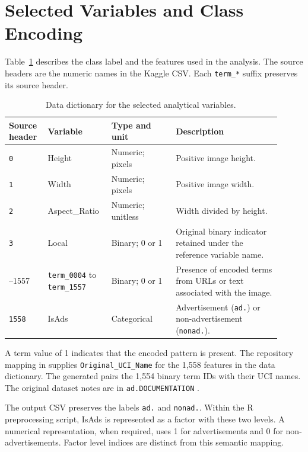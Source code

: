 \section{Selected Variables and Class Encoding}

Table~\ref{tab:selected-variables} describes the class label and the
features used in the analysis. The source headers are the numeric names in
the Kaggle CSV. Each \texttt{term\_*} suffix preserves its source header.

\begin{table}[htbp]
\centering
\small
\caption{Data dictionary for the selected analytical variables.}
\label{tab:selected-variables}
\begin{tabular}{@{}>{\raggedright\arraybackslash}p{0.13\linewidth}
                   >{\raggedright\arraybackslash}p{0.20\linewidth}
                   >{\raggedright\arraybackslash}p{0.22\linewidth}
                   >{\raggedright\arraybackslash}p{0.36\linewidth}@{}}
\toprule
Source header & Variable & Type and unit & Description\\
\midrule
\texttt{0} & Height & Numeric; pixels & Positive image height.\\
\texttt{1} & Width & Numeric; pixels & Positive image width.\\
\texttt{2} & Aspect\_Ratio & Numeric; unitless & Width divided by height.\\
\texttt{3} & Local & Binary; 0 or 1 & Original binary indicator retained under the reference variable name.\\
4--1557 & \texttt{term\_0004} to \texttt{term\_1557} & Binary; 0 or 1 & Presence of encoded terms from URLs or text associated with the image.\\
\texttt{1558} & IsAds & Categorical & Advertisement (\texttt{ad.}) or non-advertisement (\texttt{nonad.}).\\
\bottomrule
\end{tabular}
\end{table}

A term value of 1 indicates that the encoded pattern is present.
The repository mapping in  supplies
\texttt{Original\_UCI\_Name} for the 1,558 features in the data dictionary.
The generated  pairs the 1,554 binary term IDs with
their UCI names. The original dataset notes are in
\texttt{ad.DOCUMENTATION} \citep{kushmerick1999}.

The output CSV preserves the labels \texttt{ad.} and \texttt{nonad.}.
Within the R preprocessing script, IsAds is represented as a factor
with these two levels. A numerical representation, when required, uses
1 for advertisements and 0 for non-advertisements. Factor level indices
are distinct from this semantic mapping.

